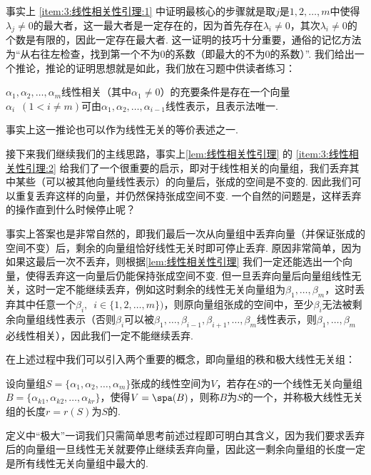 事实上 \ref*{item:3:线性相关性引理:1} 中证明最核心的步骤就是取$j$是$1,2,\ldots,m$中使得$\lambda_j\neq 0$的最大者，这一最大者是一定存在的，因为首先存在$\lambda_i\neq 0$，其次$\lambda_i\neq 0$的个数是有限的，因此一定存在最大者. 这一证明的技巧十分重要，通俗的记忆方法为``从右往左检查，找到第一个不为0的系数（即最大的不为0的系数）''. 我们给出一个推论，推论的证明思想就是如此，我们放在习题中供读者练习：
\begin{corollary}{}{}
    $\alpha_1,\alpha_2,\ldots,\alpha_m$线性相关（其中$\alpha_1\neq 0$）的充要条件是存在一个向量$\alpha_i\enspace(1<i\neq m)$可由$\alpha_1,\alpha_2,\ldots,\alpha_{i-1}$线性表示，且表示法唯一.
\end{corollary}
事实上这一推论也可以作为线性无关的等价表述之一.

接下来我们继续我们的主线思路，事实上\autoref{lem:线性相关性引理} 的 \ref*{item:3:线性相关性引理:2} 给我们了一个很重要的启示，即对于线性相关的向量组，我们丢弃其中某些（可以被其他向量线性表示）的向量后，张成的空间是不变的. 因此我们可以重复丢弃这样的向量，并仍然保持张成空间不变. 一个自然的问题是，这样丢弃的操作直到什么时候停止呢？

事实上答案也是非常自然的，即我们最后一次从向量组中丢弃向量（并保证张成的空间不变）后，剩余的向量组恰好线性无关时即可停止丢弃. 原因非常简单，因为如果这最后一次不丢弃，则根据\autoref{lem:线性相关性引理} 我们一定还能选出一个向量，使得丢弃这一向量后仍能保持张成空间不变. 但一旦丢弃向量后向量组线性无关，这时一定不能继续丢弃，例如这时剩余的线性无关向量组为$\beta_1,\ldots,\beta_m$，这时丢弃其中任意一个$\beta_i,\enspace i\in\{1,2,\ldots,m\})$，则原向量组张成的空间中，至少$\beta_i$无法被剩余向量组线性表示（否则$\beta_i$可以被$\beta_1,\ldots,\beta_{i-1},\beta_{i+1},\ldots,\beta_m$线性表示，则$\beta_1,\ldots,\beta_m$必线性相关），因此我们一定不能继续丢弃.

在上述过程中我们可以引入两个重要的概念，即向量组的秩和极大线性无关组：
\begin{definition}{}{}
    设向量组$S=\{\alpha_1,\alpha_2,\ldots,\alpha_m\}$张成的线性空间为$V$，若存在$S$的一个线性无关向量组$B=\{\alpha_{k1},\alpha_{k2},\ldots,\alpha_{kr}\}$，使得$V=\spa(B)$，则称$B$为$S$的一个，并称极大线性无关组的长度$r=r(S)$为$S$的.
\end{definition}
定义中``极大''一词我们只需简单思考前述过程即可明白其含义，因为我们要求丢弃后的向量组一旦线性无关就要停止继续丢弃向量，因此这一剩余向量组的长度一定是所有线性无关向量组中最大的.

